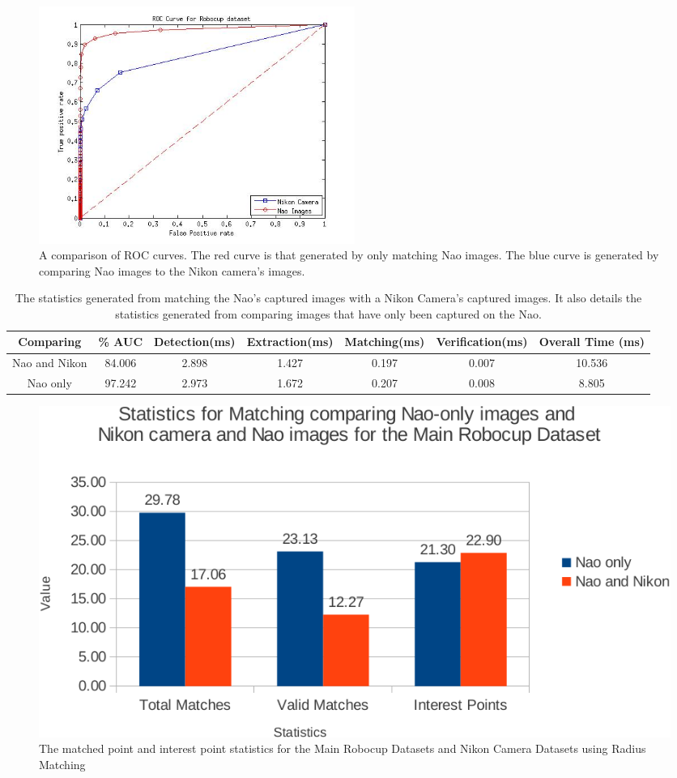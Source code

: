 \documentclass{report}
\begin{document}
\begin{figure}[h!] 
  \centering
    \includegraphics[width=0.5\textwidth]{../Drawings/camera/ROC_Robocup.jpg}
    \caption{A comparison of ROC curves. The red curve is that generated by only matching Nao images. The blue curve is generated by comparing Nao images to the Nikon camera's images. }
    \label{fig:rocRobocupNikon}
\end{figure}

\begin{table}
\caption{The statistics generated from matching the Nao's captured images with
a Nikon Camera's captured images. It also details the statistics generated from comparing images that have only been captured on the Nao.}
\begin{tabular}{|c|c|c|c|c|c|c|}
\hline 
Comparing & \% AUC & Detection(ms) & Extraction(ms) & Matching(ms) & Verification(ms) & Overall Time (ms)\tabularnewline
\hline 
\hline 
Nao and Nikon & 84.006 & 2.898 & 1.427 & 0.197 & 0.007 & 10.536\tabularnewline
\hline 
Nao only & 97.242 & 2.973 & 1.672 & 0.207 & 0.008 & 8.805\tabularnewline
\hline 
\end{tabular}
\label{tab:naoNikonRobocup}
\end{table}

\begin{figure}[h!] 
  \centering
    \includegraphics[width=1.0\textwidth]{../Drawings/Graphs/nikon_mrb_matches_keypoints.pdf}
    \caption{The matched point and interest point statistics for the Main Robocup Datasets
and Nikon Camera Datasets using Radius Matching}
    \label{fig:nikon_mrb_matches_keypoints}
\end{figure}
\end{document}
